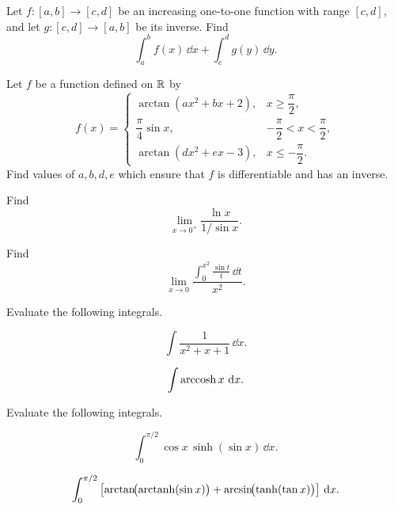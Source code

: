 \begin{problem}
\begin{problemsubparts}
\item Let $f\colon[a,b]\to[c,d]$ be an increasing one-to-one function with range $[c,d]$, and let $g\colon[c,d]\to[a,b]$ be its inverse. Find
\[
\int_a^b f(x)\,\dd x+\int_c^d g(y)\,\dd y.
\]
\item Let $f$ be a function defined on $\mathbb{R}$ by
\[
f(x)=
\begin{cases}
\arctan(ax^2+bx+2), & x\ge \dfrac{\pi}{2},\\[0.6em]
\dfrac{\pi}{4}\sin x, & -\dfrac{\pi}{2}<x<\dfrac{\pi}{2},\\[0.8em]
\arctan(dx^2+ex-3), & x\le-\dfrac{\pi}{2}.
\end{cases}
\]
Find values of $a,b,d,e$ which ensure that $f$ is differentiable and has an inverse.
\end{problemsubparts}
\end{problem}

\begin{problem}
\begin{problemsubparts}
\item Find
\[
\lim_{x\to0^+}\frac{\ln x}{1/\sin x}.
\]
\item Find
\[
\lim_{x\to0}
\frac{\displaystyle\int_0^{x^2}\frac{\sin t}{t}\,\dd t}{x^2}.
\]
\end{problemsubparts}
\end{problem}

\begin{problem}
Evaluate the following integrals.
\begin{problemsubparts}
\item
\[
\int\frac{1}{x^2+x+1}\,\dd x.
\]
\item
\[
\int\operatorname{arccosh} x\,\mathop{}\!\mathrm{d} x.
\]
\end{problemsubparts}
\end{problem}

\begin{problem}
Evaluate the following integrals.
\begin{problemsubparts}
\item
\[
\int_0^{\pi/2}\cos x\,\sinh(\sin x)\,\dd x.
\]
\item
\[
\int_0^{\pi/2}
\left[
\arctan\!\bigl(\operatorname{arctanh}(\sin x)\bigr)
+\arcsin\!\bigl(\tanh(\tan x)\bigr)
\right]\,\mathop{}\!\mathrm{d} x.
\]
\end{problemsubparts}
\end{problem}

